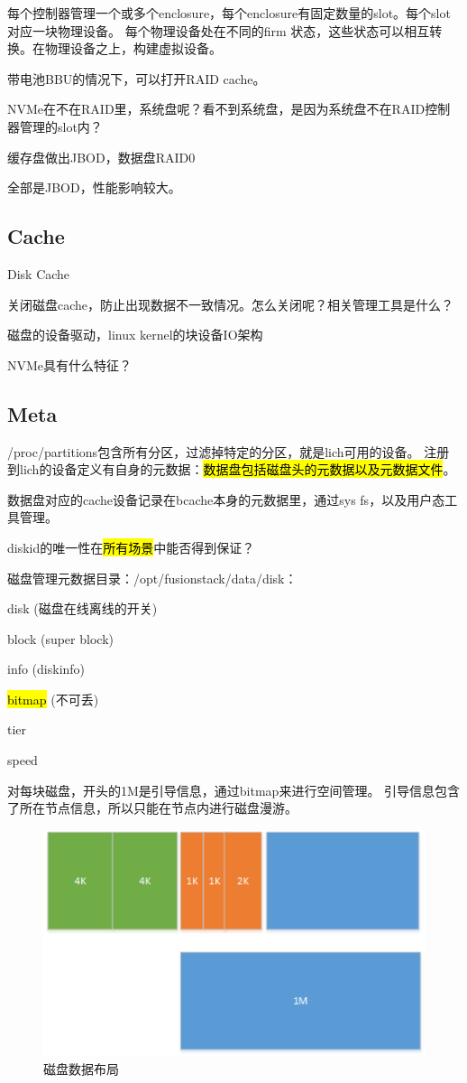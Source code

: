 每个控制器管理一个或多个enclosure，每个enclosure有固定数量的slot。每个slot对应一块物理设备。
每个物理设备处在不同的firm 状态，这些状态可以相互转换。在物理设备之上，构建虚拟设备。

带电池BBU的情况下，可以打开RAID cache。

NVMe在不在RAID里，系统盘呢？看不到系统盘，是因为系统盘不在RAID控制器管理的slot内？

缓存盘做出JBOD，数据盘RAID0

全部是JBOD，性能影响较大。

\subsection{Cache}

Disk Cache

关闭磁盘cache，防止出现数据不一致情况。怎么关闭呢？相关管理工具是什么？

磁盘的设备驱动，linux kernel的块设备IO架构

NVMe具有什么特征？

\subsection{Meta}

/proc/partitions包含所有分区，过滤掉特定的分区，就是lich可用的设备。
注册到lich的设备定义有自身的元数据：\hl{数据盘包括磁盘头的元数据以及元数据文件}。

数据盘对应的cache设备记录在bcache本身的元数据里，通过sys fs，以及用户态工具管理。

diskid的唯一性在\hl{所有场景}中能否得到保证？

磁盘管理元数据目录：/opt/fusionstack/data/disk：
\begin{compactitem}
\item disk (磁盘在线离线的开关)
\item block (super block)
\item info (diskinfo)
\item \hl{bitmap} (不可丢)
\item tier
\item speed
\end{compactitem}

对每块磁盘，开头的1M是引导信息，通过bitmap来进行空间管理。
引导信息包含了所在节点信息，所以只能在节点内进行磁盘漫游。

\begin{figure}[h]
    \centering
    \includegraphics{../images/disk_layout.png}
    \caption{磁盘数据布局}
\end{figure}

